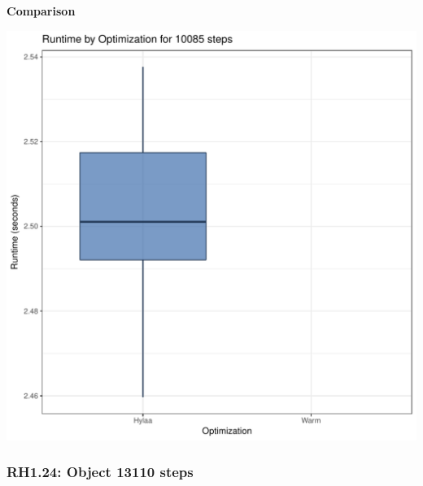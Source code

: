 \documentclass{article}\usepackage[]{graphicx}\usepackage[]{color}
\makeatletter
\def\maxwidth{ %
  \ifdim\Gin@nat@width>\linewidth
    \linewidth
  \else
    \Gin@nat@width
  \fi
}
\newenvironment{knitrout}{}{} %
\makeatother
\begin{document}
 \textbf{Comparison}
  
\begin{knitrout}
\color{fgcolor}
\includegraphics[width=\maxwidth]{figure/RH1_steps10085-1} 

\end{knitrout}


\subsubsection{RH1.24: Object 13110 steps}
\end{document}
